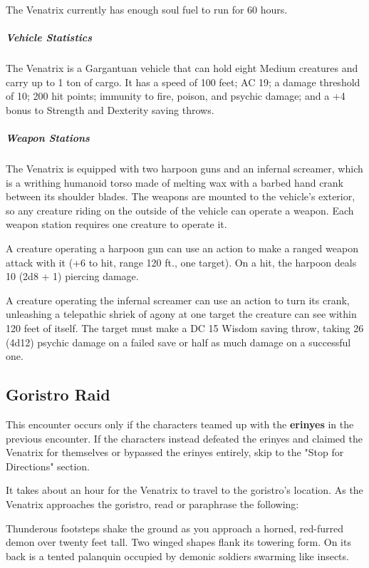 \documentclass[10pt,a4paper,twoside,bg=print,twocolumn,openany,nodeprecatedcode]{dndbook}
\begin{document}
The Venatrix currently has enough soul fuel to run for 60 hours.

\subparagraph{Vehicle Statistics}
The Venatrix is a Gargantuan vehicle that can hold eight Medium creatures and carry up to 1 ton of cargo. It has a speed of 100 feet; AC 19; a damage threshold of 10; 200 hit points; immunity to fire, poison, and psychic damage; and a +4 bonus to Strength and Dexterity saving throws.

\subparagraph{Weapon Stations}
The Venatrix is equipped with two harpoon guns and an infernal screamer, which is a writhing humanoid torso made of melting wax with a barbed hand crank between its shoulder blades. The weapons are mounted to the vehicle's exterior, so any creature riding on the outside of the vehicle can operate a weapon. Each weapon station requires one creature to operate it.

A creature operating a harpoon gun can use an action to make a ranged weapon attack with it (+6 to hit, range 120 ft., one target). On a hit, the harpoon deals 10 (2d8 + 1) piercing damage.

A creature operating the infernal screamer can use an action to turn its crank, unleashing a telepathic shriek of agony at one target the creature can see within 120 feet of itself. The target must make a DC 15 Wisdom saving throw, taking 26 (4d12) psychic damage on a failed save or half as much damage on a successful one.

\subsection{Goristro Raid}
This encounter occurs only if the characters teamed up with the \textbf{erinyes} in the previous encounter. If the characters instead defeated the erinyes and claimed the Venatrix for themselves or bypassed the erinyes entirely, skip to the "Stop for Directions" section.

It takes about an hour for the Venatrix to travel to the goristro's location. As the Venatrix approaches the goristro, read or paraphrase the following:

\begin{DndReadAloud}{}
Thunderous footsteps shake the ground as you approach a horned, red-furred demon over twenty feet tall. Two winged shapes flank its towering form. On its back is a tented palanquin occupied by demonic soldiers swarming like insects.

\end{DndReadAloud}
\end{document}
